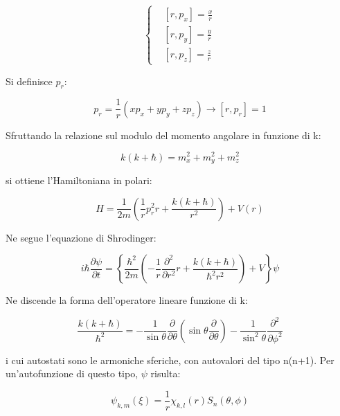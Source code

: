 \documentclass{article}
\begin{document}
\begin{equation}
    \left\{
    \begin{aligned}
        & [r, p_x]=\frac{x}{r} \\
        & [r, p_y]=\frac{y}{r} \\
        & [r, p_z]=\frac{z}{r}
    \end{aligned}
    \right.
\end{equation}

Si definisce $p_r$:

\begin{equation}
    p_r=\frac{1}{r}(xp_x+yp_y+zp_z) \rightarrow [r, p_r]=1
\end{equation}

Sfruttando la relazione sul modulo del momento angolare in funzione di k:

\begin{equation}
    k(k+\hbar)=m_x^2+m_y^2+m_z^2
\end{equation}

si ottiene l'Hamiltoniana in polari:

\begin{equation}
    H=\frac{1}{2m}\left ( \frac{1}{r}p_r^2 r +\frac{k(k+\hbar)}{r^2}\right )+V(r)
\end{equation}

Ne segue l'equazione di Shrodinger:

\begin{equation}
    i\hbar \frac{\partial \psi}{\partial t}= \left \{ \frac{\hbar^2}{2m}\left ( -\frac{1}{r}\frac{\partial^2}{\partial r^2}r+\frac{k(k+\hbar)}{\hbar^2r^2} \right ) +V \right \} \psi
\end{equation}

Ne discende la forma dell'operatore lineare funzione di k:

\begin{equation}
   \frac{k(k+\hbar)}{\hbar^2}= -\frac{1}{\sin{\theta}}\frac{\partial}{\partial \theta}\left ( \sin{\theta}\frac{\partial}{\partial \theta} \right ) - \frac{1}{\sin^2{\theta}}\frac{\partial^2}{\partial \phi^2}
\end{equation}

i cui autostati sono le armoniche sferiche, con autovalori del tipo n(n+1). Per un'autofunzione di questo tipo, $\psi$ risulta:

\begin{equation}
    \psi_{k,m}(\xi)=\frac{1}{r}\chi_{k,l}(r)S_n(\theta, \phi)
\end{equation}
\end{document}
